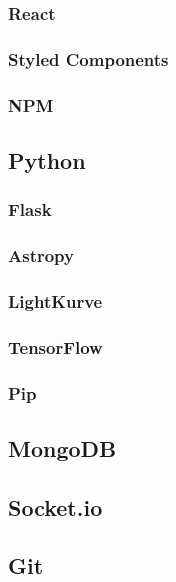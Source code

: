 \documentclass[a4paper,12pt]{article}
\begin{document}
{{\subsubsection{React}

\subsubsection{Styled Components}

\subsubsection{NPM}

\subsection{Python}

\subsubsection{Flask}

\subsubsection{Astropy}

\subsubsection{LightKurve}

\subsubsection{TensorFlow}

\subsubsection{Pip}

\subsection{MongoDB}

\subsection{Socket.io}

\subsection{Git}


}}
\end{document}

